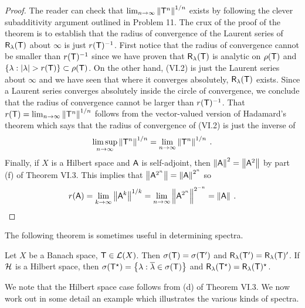 \begin{proof}
    The reader can check that $\lim_{n \rightarrow \infty} \left \Vert \mathsf{T}^n \right \Vert^{1/n}$ exists by following the clever subadditivity argument outlined in Problem 11. The crux of the proof of the theorem is to establish that the radius of convergence of the Laurent series of $\mathsf{R}_\lambda( \mathsf{T} )$ about $\infty$ is just $r(\mathsf{T})^{-1}$. First notice that the radius of convergence cannot be smaller than $r(\mathsf{T})^{-1}$ since we have proven that $\mathsf{R}_\lambda( \mathsf{T} )$ is analytic on $\rho(\mathsf{T})$ and $\left \lbrace \lambda : |\lambda| > r(\mathsf{T}) \right \rbrace \subset \rho (\mathsf{T})$. On the other hand, (VI.2) is just the Laurent series about $\infty$ and we have seen that where it converges absolutely, $\mathsf{R}_\lambda( \mathsf{T} )$ exists. Since a Laurent series converges absolutely inside the circle of convergence, we conclude that the radius of convergence cannot be larger than $r(\mathsf{T})^{-1}$. That $r(\mathsf{T}) = \lim_{n \rightarrow \infty} \left \Vert \mathsf{T}^n \right \Vert^{1/n}$ follows from the vector-valued version of Hadamard’s theorem which says that the radius of convergence of (VI.2) is just the inverse of
    \begin{align}
        \limsup_{n \rightarrow \infty} \left \Vert \mathsf{T}^n \right \Vert^{1/n} = \lim_{n \rightarrow \infty} \left \Vert \mathsf{T}^n \right \Vert^{1/n} \:.
    \end{align}
    Finally, if $X$ is a Hilbert space and $\mathsf{A}$ is self-adjoint, then $\left \Vert \mathsf{A} \right \Vert^2 = \left \Vert \mathsf{A}^2 \right \Vert$ by part (f) of Theorem VI.3. This implies that $\left \Vert \mathsf{A}^{2^n} \right \Vert = \left \Vert \mathsf{A} \right \Vert^{2^n}$ so \begin{align}
        r(\mathsf{A}) = \lim_{k \rightarrow \infty} \left \Vert \mathsf{A}^k \right \Vert^{1/k} = \lim_{n \rightarrow \infty} \left \Vert \mathsf{A}^{2^n} \right \Vert^{2^{-n}} = \left \Vert \mathsf{A} \right \Vert \:.
    \end{align}
\end{proof}

The following theorem is sometimes useful in determining spectra.

\begin{theorem}[Phillips]
    Let $X$ be a Banach space, $\mathsf{T} \in \mathcal L(X)$. Then $\sigma(\mathsf{T}) = \sigma (\mathsf{T}')$ and $\mathsf{R}_\lambda (\mathsf{T}') = \mathsf{R}_\lambda (\mathsf{T})'$. If $\mathcal{H}$ is a Hilbert space, then $\sigma (\mathsf{T}^\star) = \left \lbrace \lambda : \overline \lambda \in \sigma (\mathsf{T})  \right \rbrace$ and $\mathsf{R}_\lambda (\mathsf{T}^\star) = \mathsf{R}_\lambda (\mathsf{T})^\star$.
\end{theorem}

We note that the Hilbert space case follows from (d) of Theorem VI.3.
We now work out in some detail an example which illustrates the various
kinds of spectra.

